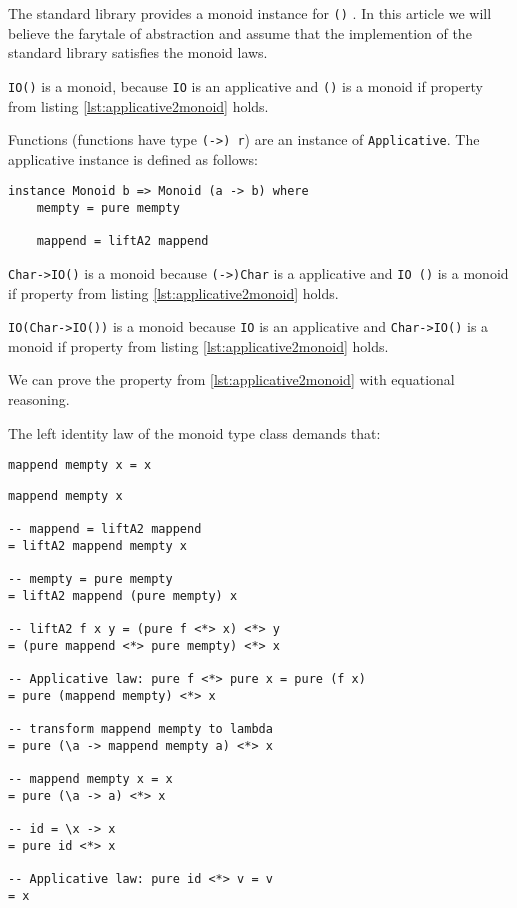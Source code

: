 \begin{etaremune}
\item The standard library provides a monoid instance for \verb|()| \cite{monoid}. In this article we will believe the farytale of abstraction and assume that the implemention of the standard library satisfies the monoid laws.
\item \verb|IO()| is a monoid, because \verb|IO| is an applicative and \verb|()| is a monoid if property from listing \ref{lst:applicative2monoid} holds.
\item Functions (functions have type \verb|(->) r|) are an instance of \verb|Applicative|. The applicative instance is defined as follows:
\begin{verbatim}
instance Monoid b => Monoid (a -> b) where
    mempty = pure mempty

    mappend = liftA2 mappend
\end{verbatim}
 \verb|Char->IO()| is a monoid because \verb|(->)Char| is a applicative and \verb|IO ()| is a monoid if property from listing \ref{lst:applicative2monoid} holds.
\item \verb|IO(Char->IO())| is a monoid because \verb|IO| is an applicative and \verb|Char->IO()| is a monoid if property from listing \ref{lst:applicative2monoid} holds.
\item  We can prove the property from \ref{lst:applicative2monoid} with equational reasoning.
\end{etaremune} 

The left identity law of the monoid type class demands that:
\begin{verbatim}
mappend mempty x = x
\end{verbatim}

\begin{verbatim}
mappend mempty x

-- mappend = liftA2 mappend  
= liftA2 mappend mempty x

-- mempty = pure mempty   
= liftA2 mappend (pure mempty) x

-- liftA2 f x y = (pure f <*> x) <*> y
= (pure mappend <*> pure mempty) <*> x

-- Applicative law: pure f <*> pure x = pure (f x)
= pure (mappend mempty) <*> x

-- transform mappend mempty to lambda
= pure (\a -> mappend mempty a) <*> x

-- mappend mempty x = x
= pure (\a -> a) <*> x

-- id = \x -> x
= pure id <*> x

-- Applicative law: pure id <*> v = v
= x
\end{verbatim}
